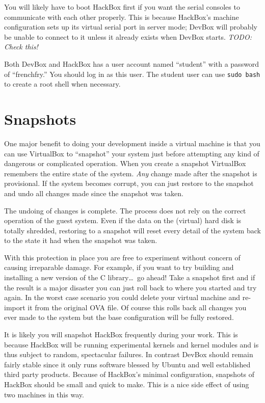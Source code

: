 \documentclass[twocolumn]{article}
\begin{document}
You will likely have to boot HackBox first if you want the serial consoles to communicate with
each other properly. This is because HackBox's machine configuration sets up its virtual serial
port in server mode; DevBox will probably be unable to connect to it unless it already exists
when DevBox starts. \textit{TODO: Check this!}

Both DevBox and HackBox has a user account named ``student'' with a password of ``frenchfry.''
You should log in as this user. The student user can use \texttt{sudo bash} to create a root
shell when necessary.

\section{Snapshots}

One major benefit to doing your development inside a virtual machine is that you can use
VirtualBox to ``snapshot'' your system just before attempting any kind of dangerous or
complicated operation. When you create a snapshot VirtualBox remembers the entire state of the
system. \emph{Any} change made after the snapshot is provisional. If the system becomes corrupt,
you can just restore to the snapshot and undo all changes made since the snapshot was taken.

The undoing of changes is complete. The process does not rely on the correct operation of the
guest system. Even if the data on the (virtual) hard disk is totally shredded, restoring to a
snapshot will reset every detail of the system back to the state it had when the snapshot was
taken.

With this protection in place you are free to experiment without concern of causing irreparable
damage. For example, if you want to try building and installing a new version of the C
library\ldots\ go ahead! Take a snapshot first and if the result is a major disaster you can
just roll back to where you started and try again. In the worst case scenario you could delete
your virtual machine and re-import it from the original OVA file. Of course this rolls back all
changes you ever made to the system but the base configuration will be fully restored.

It is likely you will snapshot HackBox frequently during your work. This is because HackBox will
be running experimental kernels and kernel modules and is thus subject to random, spectacular
failures. In contrast DevBox should remain fairly stable since it only runs software blessed by
Ubuntu and well established third party products. Because of HackBox's minimal configuration,
snapshots of HackBox should be small and quick to make. This is a nice side effect of using two
machines in this way.
\end{document}
